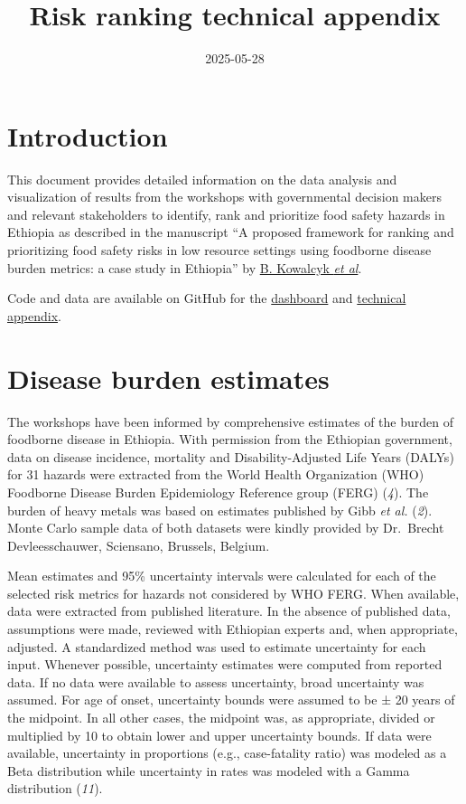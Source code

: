 \documentclass[
  letterpaper,
  DIV=11,
  numbers=noendperiod]{scrartcl}
\title{Risk ranking technical appendix}
\author{}
\date{2025-05-28}
\renewcommand*\contentsname{Table of contents}
\newcommand\contentsname{Table of contents}
\begin{document}
\maketitle

\renewcommand*\contentsname{Table of contents}
{
\hypersetup{linkcolor=}
\setcounter{tocdepth}{3}
\tableofcontents
}

\section{Introduction}\label{introduction}

This document provides detailed information on the data analysis and
visualization of results from the workshops with governmental decision
makers and relevant stakeholders to identify, rank and prioritize food
safety hazards in Ethiopia as described in the manuscript ``A proposed
framework for ranking and prioritizing food safety risks in low resource
settings using foodborne disease burden metrics: a case study in
Ethiopia'' by \href{https://doi.org/10.1016/j.jfp.2025.100525}{B.
Kowalcyk \emph{et al}}.

Code and data are available on GitHub for the
\href{https://github.com/TARTARE-Ethiopia/ETH_Dashboard}{dashboard} and
\href{https://github.com/TARTARE-Ethiopia/ETH-TechApp}{technical
appendix}.

\section{Disease burden estimates}\label{disease-burden-estimates}

The workshops have been informed by comprehensive estimates of the
burden of foodborne disease in Ethiopia. With permission from the
Ethiopian government, data on disease incidence, mortality and
Disability-Adjusted Life Years (DALYs) for 31 hazards were extracted
from the World Health Organization (WHO) Foodborne Disease Burden
Epidemiology Reference group (FERG) (\emph{4}). The burden of heavy
metals was based on estimates published by Gibb \emph{et al.}
(\emph{2}). Monte Carlo sample data of both datasets were kindly
provided by Dr.~Brecht Devleesschauwer, Sciensano, Brussels, Belgium.

Mean estimates and 95\% uncertainty intervals were calculated for each
of the selected risk metrics for hazards not considered by WHO FERG.
When available, data were extracted from published literature. In the
absence of published data, assumptions were made, reviewed with
Ethiopian experts and, when appropriate, adjusted. A standardized method
was used to estimate uncertainty for each input. Whenever possible,
uncertainty estimates were computed from reported data. If no data were
available to assess uncertainty, broad uncertainty was assumed. For age
of onset, uncertainty bounds were assumed to be ± 20 years of the
midpoint. In all other cases, the midpoint was, as appropriate, divided
or multiplied by 10 to obtain lower and upper uncertainty bounds. If
data were available, uncertainty in proportions (e.g., case-fatality
ratio) was modeled as a Beta distribution while uncertainty in rates was
modeled with a Gamma distribution (\emph{11}).
\end{document}

